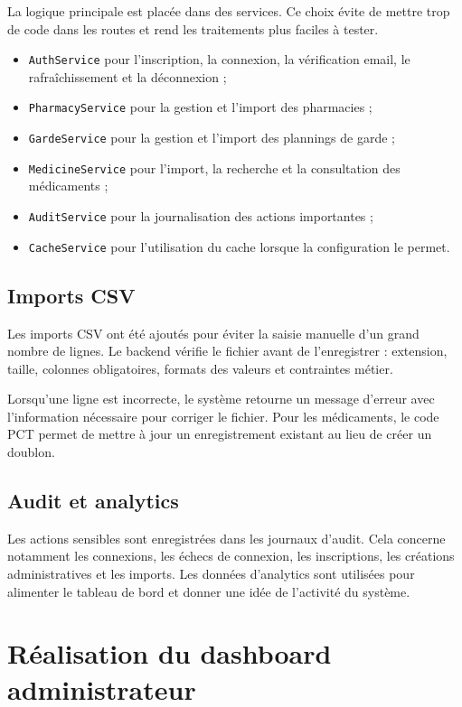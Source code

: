 La logique principale est placée dans des services. Ce choix évite de mettre trop de code dans les routes
et rend les traitements plus faciles à tester.

\begin{itemize}
    \item \texttt{AuthService} pour l'inscription, la connexion, la vérification email, le rafraîchissement et la déconnexion ;
    \item \texttt{PharmacyService} pour la gestion et l'import des pharmacies ;
    \item \texttt{GardeService} pour la gestion et l'import des plannings de garde ;
    \item \texttt{MedicineService} pour l'import, la recherche et la consultation des médicaments ;
    \item \texttt{AuditService} pour la journalisation des actions importantes ;
    \item \texttt{CacheService} pour l'utilisation du cache lorsque la configuration le permet.
\end{itemize}

\subsection{Imports CSV}

Les imports CSV ont été ajoutés pour éviter la saisie manuelle d'un grand nombre de lignes. Le backend
vérifie le fichier avant de l'enregistrer : extension, taille, colonnes obligatoires, formats des valeurs et
contraintes métier.

Lorsqu'une ligne est incorrecte, le système retourne un message d'erreur avec l'information nécessaire
pour corriger le fichier. Pour les médicaments, le code PCT permet de mettre à jour un enregistrement
existant au lieu de créer un doublon.

\subsection{Audit et analytics}

Les actions sensibles sont enregistrées dans les journaux d'audit. Cela concerne notamment les
connexions, les échecs de connexion, les inscriptions, les créations administratives et les imports. Les
données d'analytics sont utilisées pour alimenter le tableau de bord et donner une idée de l'activité du
système.

\section{Réalisation du dashboard administrateur}

